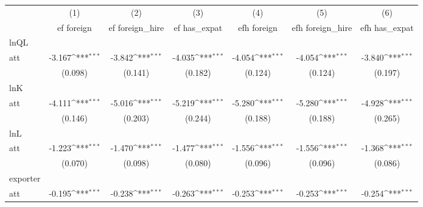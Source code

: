 {
\def\sym#1{\ifmmode^{#1}\else\(^{#1}\)\fi}
\begin{tabular}{l*{6}{c}}
\hline\hline
            &\multicolumn{1}{c}{(1)}&\multicolumn{1}{c}{(2)}&\multicolumn{1}{c}{(3)}&\multicolumn{1}{c}{(4)}&\multicolumn{1}{c}{(5)}&\multicolumn{1}{c}{(6)}\\
            &\multicolumn{1}{c}{ef foreign}&\multicolumn{1}{c}{ef foreign\_hire}&\multicolumn{1}{c}{ef has\_expat}&\multicolumn{1}{c}{efh foreign}&\multicolumn{1}{c}{efh foreign\_hire}&\multicolumn{1}{c}{efh has\_expat}\\
\hline
lnQL        &                     &                     &                     &                     &                     &                     \\
att         &      -3.167\sym{***}&      -3.842\sym{***}&      -4.035\sym{***}&      -4.054\sym{***}&      -4.054\sym{***}&      -3.840\sym{***}\\
            &     (0.098)         &     (0.141)         &     (0.182)         &     (0.124)         &     (0.124)         &     (0.197)         \\
\hline
lnK         &                     &                     &                     &                     &                     &                     \\
att         &      -4.111\sym{***}&      -5.016\sym{***}&      -5.219\sym{***}&      -5.280\sym{***}&      -5.280\sym{***}&      -4.928\sym{***}\\
            &     (0.146)         &     (0.203)         &     (0.244)         &     (0.188)         &     (0.188)         &     (0.265)         \\
\hline
lnL         &                     &                     &                     &                     &                     &                     \\
att         &      -1.223\sym{***}&      -1.470\sym{***}&      -1.477\sym{***}&      -1.556\sym{***}&      -1.556\sym{***}&      -1.368\sym{***}\\
            &     (0.070)         &     (0.098)         &     (0.080)         &     (0.096)         &     (0.096)         &     (0.086)         \\
\hline
exporter    &                     &                     &                     &                     &                     &                     \\
att         &      -0.195\sym{***}&      -0.238\sym{***}&      -0.263\sym{***}&      -0.253\sym{***}&      -0.253\sym{***}&      -0.254\sym{***}\\

\end{tabular}}
